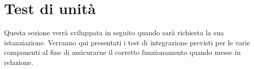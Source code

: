 \documentclass[PianoDiQualifica.tex]{subfiles}
\begin{document}
\chapter{Test di unità}
Questa sezione verrà sviluppata in seguito quando sarà richiesta la sua istanziazione.
Verranno qui presentati i test di integrazione previsti per le varie componenti al fine di assicurarne il corretto funzionamento quando messe in relazione.
\end{document}
